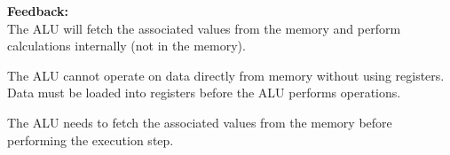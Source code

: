 \textbf{Feedback:} \\
The ALU will fetch the associated values from the memory and perform calculations internally (not in the memory).

The ALU cannot operate on data directly from memory without using registers. Data must be loaded into registers before the ALU performs operations.

The ALU needs to fetch the associated values from the memory before performing the execution step.
